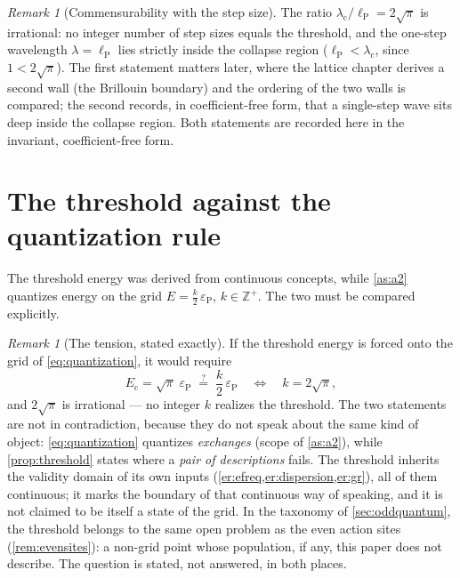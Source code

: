 \documentclass[11pt]{amsbook}
\theoremstyle{plain}
\theoremstyle{definition}
\theoremstyle{remark}
\newtheorem{remark}[theorem]{Remark}
\begin{document}
\begin{remark}[Commensurability with the step size]\label{rem:commensurate}
The ratio $\lambda_{\mathrm c} / \ell_{\mathrm P} = 2\sqrt{\pi}$ is irrational: no integer number of step sizes equals the threshold, and the one-step wavelength $\lambda = \ell_{\mathrm P}$ lies strictly inside the collapse region ($\ell_{\mathrm P} < \lambda_{\mathrm c}$, since $1 < 2\sqrt{\pi}$). The first statement matters later, where the lattice chapter derives a second wall (the Brillouin boundary) and the ordering of the two walls is compared; the second records, in coefficient-free form, that a single-step wave sits deep inside the collapse region. Both statements are recorded here in the invariant, coefficient-free form.
\end{remark}

\section{The threshold against the quantization rule}\label{sec:light-tension}

The threshold energy was derived from continuous concepts, while \cref{as:a2} quantizes energy on the grid $E = \frac{k}{2}\,\varepsilon_{\mathrm P}$, $k \in \mathbb{Z}^{+}$. The two must be compared explicitly.

\begin{remark}[The tension, stated exactly]\label{rem:tension}
If the threshold energy is forced onto the grid of \cref{eq:quantization}, it would require
\begin{equation}\label{eq:tension}
E_{\mathrm c} = \sqrt{\pi}\; \varepsilon_{\mathrm P} \;\overset{?}{=}\; \frac{k}{2}\,\varepsilon_{\mathrm P}
\quad\Longleftrightarrow\quad
k = 2\sqrt{\pi},
\end{equation}
and $2\sqrt{\pi}$ is irrational --- no integer $k$ realizes the threshold. The two statements are not in contradiction, because they do not speak about the same kind of object: \cref{eq:quantization} quantizes \emph{exchanges} (scope of \cref{as:a2}), while \cref{prop:threshold} states where a \emph{pair of descriptions} fails. The threshold inherits the validity domain of its own inputs (\cref{er:efreq,er:dispersion,er:gr}), all of them continuous; it marks the boundary of that continuous way of speaking, and it is not claimed to be itself a state of the grid. In the taxonomy of \cref{sec:oddquantum}, the threshold belongs to the same open problem as the even action sites (\cref{rem:evensites}): a non-grid point whose population, if any, this paper does not describe. The question is stated, not answered, in both places.
\end{remark}
\end{document}
